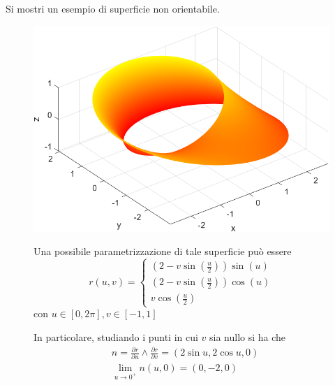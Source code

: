 \begin{example} 
    Si mostri un esempio di superficie non orientabile.
\begin{figure}[H]
     \centering
     \begin{minipage}{0.4\textwidth}
     \includegraphics[width=\textwidth]{Capitoli/Capitolo6/Nastro di Moebius.png}
     \end{minipage}
     \begin{minipage}{0.55\textwidth}
        Una possibile parametrizzazione di tale superficie può essere
        \begin{equation*}
            r(u,v)= \begin{cases}
                \left(2-v \sin\left(\frac{u}{2}\right)\right) \sin(u)\\
                \left(2-v \sin\left(\frac{u}{2}\right)\right) \cos (u)\\
                v \cos\left(\frac{u}{2}\right)
            \end{cases}
        \end{equation*}
    con $u \in [0, 2\pi], v \in [-1,1]$
     \end{minipage}
 \end{figure}
 \begin{figure}[H]
     \centering
     \begin{minipage}{0.5\textwidth}
 In particolare, studiando i punti in cui $v$ sia nullo si ha che
 \begin{align*}
     & n=\frac{\partial r}{\partial u} \wedge \frac{\partial r}{\partial v}=(2\sin u, 2 \cos u, 0)\\
     &\lim_{u \to 0^+} n (u,0) = (0,-2,0)\\

\end{align*}
\end{minipage}
\end{figure}
\end{example}
